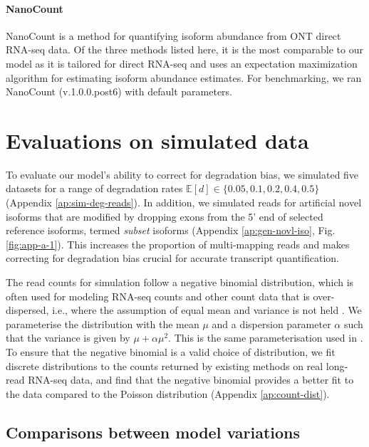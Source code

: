 \paragraph{NanoCount} NanoCount \cite{Gleeson2021} is a method for quantifying isoform abundance from ONT direct RNA-seq data. Of the three methods listed here, it is the most comparable to our model as it is tailored for direct RNA-seq and uses an expectation maximization algorithm for estimating isoform abundance estimates. For benchmarking, we ran NanoCount (v.1.0.0.post6) with default parameters.

\section{Evaluations on simulated data}\label{sec:eval-sim}

To evaluate our model's ability to correct for degradation bias, we simulated five datasets for a range of degradation rates $\mathbb{E}[d]\in\{0.05,0.1,0.2,0.4,0.5\}$ (Appendix \ref{ap:sim-deg-reads}). In addition, we simulated reads for artificial novel isoforms that are modified by dropping exons from the 5' end of selected reference isoforms, termed \textit{subset} isoforms (Appendix \ref{ap:gen-novl-iso}, Fig. \ref{fig:app-a-1}). This increases the proportion of multi-mapping reads and makes correcting for degradation bias crucial for accurate transcript quantification. 

The read counts for simulation follow a negative binomial distribution, which is often used for modeling RNA-seq counts and other count data that is over-dispersed, i.e., where the assumption of equal mean and variance is not held \cite{Cameron2013, Anders2010, Robinson2010}. We parameterise the distribution with the mean $\mu$ and a dispersion parameter $\alpha$ such that the variance is given by $\mu+\alpha\mu^2$. This is the same parameterisation used in \cite{Robinson2010}. To ensure that the negative binomial is a valid choice of distribution, we fit discrete distributions to the counts returned by existing methods on real long-read RNA-seq data, and find that the negative binomial provides a better fit to the data compared to the Poisson distribution (Appendix \ref{ap:count-dist}).   

\subsection{Comparisons between model variations}



